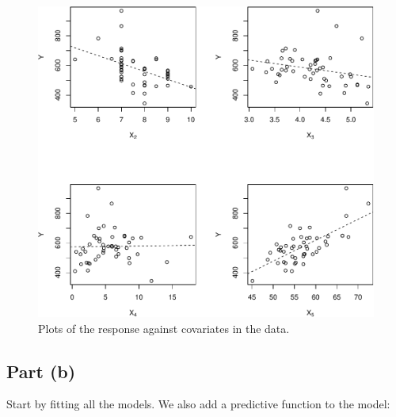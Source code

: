 \documentclass[
]{homework}
\begin{document}
\begin{figure}

{\centering \includegraphics[width=0.49\linewidth]{finalexam_files/figure-latex/ex4-pairs-1} 

}

\caption{Plots of the response against covariates in the data.}\label{fig:ex4-pairs}
\end{figure}

\subsection{Part (b)}\label{part-b-3}

Start by fitting all the models. We also add a predictive function to the model:
\end{document}

